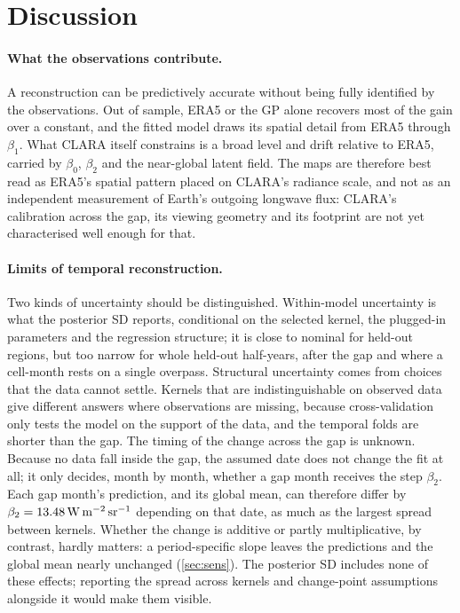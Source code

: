 \documentclass[10pt,twocolumn,a4paper]{article}
\newcommand{\clara}[1]{\SI{#1}{W.m^{-2}.sr^{-1}}}
\begin{document}
\section{Discussion}\label{sec:discussion}

\paragraph{What the observations contribute.} A reconstruction can be predictively accurate without being fully identified by the observations. Out of sample, ERA5 or the GP alone recovers most of the gain over a constant, and the fitted model draws its spatial detail from ERA5 through $\beta_1$. What CLARA itself constrains is a broad level and drift relative to ERA5, carried by $\beta_0$, $\beta_2$ and the near-global latent field. The maps are therefore best read as ERA5's spatial pattern placed on CLARA's radiance scale, and not as an independent measurement of Earth's outgoing longwave flux: CLARA's calibration across the gap, its viewing geometry and its footprint are not yet characterised well enough for that.

\paragraph{Limits of temporal reconstruction.} Two kinds of uncertainty should be distinguished. Within-model uncertainty is what the posterior SD reports, conditional on the selected kernel, the plugged-in parameters and the regression structure; it is close to nominal for held-out regions, but too narrow for whole held-out half-years, after the gap and where a cell-month rests on a single overpass. Structural uncertainty comes from choices that the data cannot settle. Kernels that are indistinguishable on observed data give different answers where observations are missing, because cross-validation only tests the model on the support of the data, and the temporal folds are shorter than the gap. The timing of the change across the gap is unknown. Because no data fall inside the gap, the assumed date does not change the fit at all; it only decides, month by month, whether a gap month receives the step $\beta_2$. Each gap month's prediction, and its global mean, can therefore differ by $\beta_2=\clara{\betaTwo}$ depending on that date, as much as the largest spread between kernels. Whether the change is additive or partly multiplicative, by contrast, hardly matters: a period-specific slope leaves the predictions and the global mean nearly unchanged (\cref{sec:sens}). The posterior SD includes none of these effects; reporting the spread across kernels and change-point assumptions alongside it would make them visible.
\end{document}
